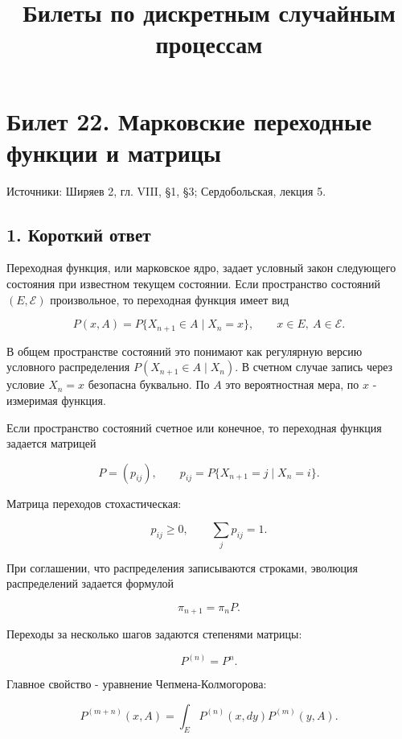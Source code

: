 \documentclass[
  11pt,
  a4paper,
]{article}
\title{Билеты по дискретным случайным процессам}
\author{}
\date{}
\begin{document}
\maketitle

\section{Билет 22. Марковские переходные функции и
матрицы}\label{ux431ux438ux43bux435ux442-22.-ux43cux430ux440ux43aux43eux432ux441ux43aux438ux435-ux43fux435ux440ux435ux445ux43eux434ux43dux44bux435-ux444ux443ux43dux43aux446ux438ux438-ux438-ux43cux430ux442ux440ux438ux446ux44b}

Источники: Ширяев 2, гл. VIII, §1, §3; Сердобольская, лекция 5.

\subsection{1. Короткий
ответ}\label{ux43aux43eux440ux43eux442ux43aux438ux439-ux43eux442ux432ux435ux442}

Переходная функция, или марковское ядро, задает условный закон
следующего состояния при известном текущем состоянии. Если пространство
состояний \((E,\mathcal E)\) произвольное, то переходная функция имеет
вид

\[
P(x,A)=P\{X_{n+1}\in A\mid X_n=x\},
\qquad
x\in E,\ A\in\mathcal E.
\]

В общем пространстве состояний это понимают как регулярную версию
условного распределения \(P(X_{n+1}\in A\mid X_n)\). В счетном случае
запись через условие \(X_n=x\) безопасна буквально. По \(A\) это
вероятностная мера, по \(x\) - измеримая функция.

Если пространство состояний счетное или конечное, то переходная функция
задается матрицей

\[
P=(p_{ij}),
\qquad
p_{ij}=P\{X_{n+1}=j\mid X_n=i\}.
\]

Матрица переходов стохастическая:

\[
p_{ij}\ge0,
\qquad
\sum_j p_{ij}=1.
\]

При соглашении, что распределения записываются строками, эволюция
распределений задается формулой

\[
\pi_{n+1}=\pi_nP.
\]

Переходы за несколько шагов задаются степенями матрицы:

\[
P^{(n)}=P^n.
\]

Главное свойство - уравнение Чепмена-Колмогорова:

\[
P^{(m+n)}(x,A)
=
\int_E P^{(n)}(x,dy)P^{(m)}(y,A).
\]
\end{document}
